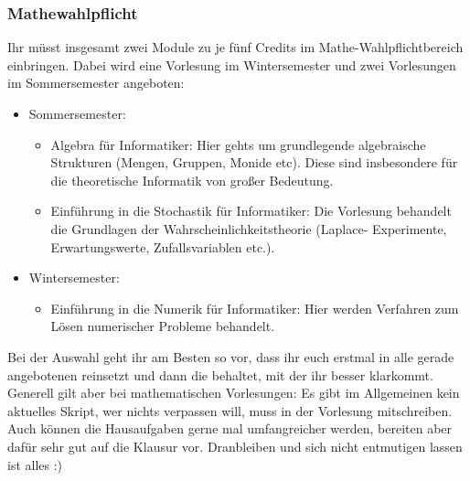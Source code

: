 \subsubsection{Mathewahlpflicht}
Ihr müsst insgesamt zwei Module zu je fünf Credits
	im Mathe-Wahlpflichtbereich einbringen. Dabei wird eine Vorlesung im Wintersemester und zwei
	Vorlesungen im Sommersemester	angeboten:
	\begin{itemize}
	  \item Sommersemester: 
	    \begin{itemize} 
	      \item Algebra für Informatiker: Hier gehts um grundlegende
		algebraische Strukturen (Mengen, Gruppen, Monide etc). Diese sind insbesondere für die
		theoretische Informatik von großer Bedeutung.
	      \item Einführung in die Stochastik für Informatiker: Die
		Vorlesung behandelt die Grundlagen der
		Wahrscheinlichkeitstheorie (Laplace- Experimente,
		Erwartungswerte, Zufallsvariablen etc.). 
	    \end{itemize}
	  \item Wintersemester: 
	    \begin{itemize}
	      \item Einführung in die Numerik für Informatiker: Hier
		werden Verfahren zum Lösen numerischer Probleme
		behandelt. 
	    \end{itemize}
	\end{itemize}
	Bei der Auswahl geht ihr am Besten so vor, dass ihr euch erstmal
	in alle gerade angebotenen reinsetzt und dann die behaltet, mit der ihr besser
	klarkommt. Generell gilt aber bei mathematischen Vorlesungen: Es
	gibt im Allgemeinen kein aktuelles Skript, wer nichts verpassen
	will, muss in der Vorlesung mitschreiben. Auch können die
	Hausaufgaben gerne mal umfangreicher werden, bereiten aber dafür
	sehr gut auf die Klausur vor. Dranbleiben und sich nicht
	entmutigen lassen ist alles :)